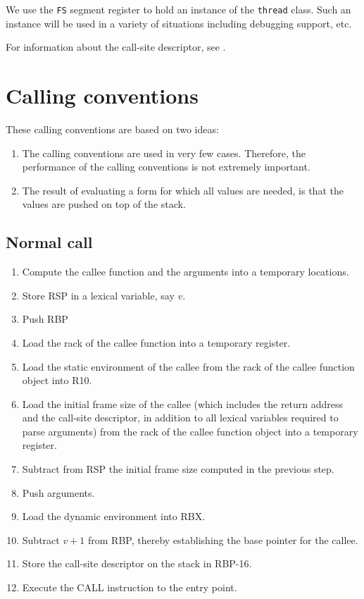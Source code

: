 We use the \texttt{FS} segment register to hold an instance of the
\texttt{thread} class.  Such an instance will be used in a variety of
situations including debugging support, etc.

For information about the call-site descriptor, see
.


\section{Calling conventions}

These calling conventions are based on two ideas:

\begin{enumerate}
\item The calling conventions are used in very few cases.  Therefore,
  the performance of the calling conventions is not extremely
  important.
\item The result of evaluating a form for which all values are needed,
  is that the values are pushed on top of the stack.
\end{enumerate}

\subsection{Normal call}

\begin{enumerate}
\item Compute the callee function and the arguments into a temporary
  locations.
\item Store RSP in a lexical variable, say $v$.
\item Push RBP
\item Load the rack of the callee function into a temporary register.
\item Load the static environment of the callee from the rack of the
  callee function object into R10.
\item Load the initial frame size of the callee (which
  includes the return address and the call-site descriptor, in
  addition to all lexical variables required to parse arguments) from
  the rack of the callee function object into a temporary register.
\item Subtract from RSP the initial frame size computed in the
  previous step.
\item Push arguments.
\item Load the dynamic environment into RBX.
\item Subtract $v+1$ from RBP, thereby establishing the base pointer
  for the callee.
\item Store the call-site descriptor on the stack in RBP-16.
\item Execute the CALL instruction to the entry point.
\end{enumerate}

